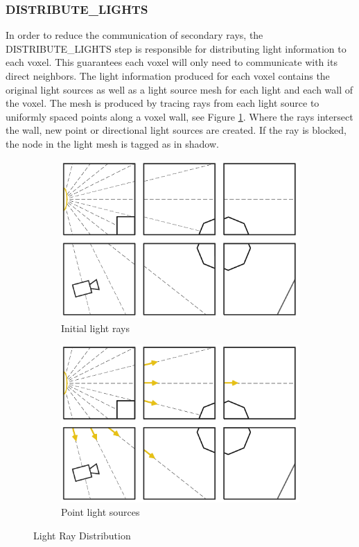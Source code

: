 \subsubsection{DISTRIBUTE\_LIGHTS}

In order to reduce the communication of secondary rays,
the DISTRIBUTE\_LIGHTS step is responsible for distributing light
information to each voxel. This guarantees each voxel will only need
to communicate with its direct neighbors. The light information
produced for each voxel contains the original light sources as well as
a light source mesh for each light and each wall of the voxel. The
mesh is produced by tracing rays from each light source to uniformly
spaced points along a voxel wall, see Figure \ref{fig:light}. Where
the rays intersect the wall, new point or directional light sources
are created. If the ray is blocked, the node in the light mesh is
tagged as in shadow.

\begin{figure}[!htb]
\centering
\begin{subfigure}{.49\columnwidth}
 \centering
  \includegraphics[width=.98\columnwidth]{drawings/Lights1.pdf}
  \caption{Initial light rays}
\end{subfigure}
\begin{subfigure}{.49\columnwidth}
 \centering
  \includegraphics[width=.98\columnwidth]{drawings/Lights2.pdf}
  \caption{Point light sources}
\end{subfigure}
\caption{Light Ray Distribution}
\label{fig:light}
\end{figure}

